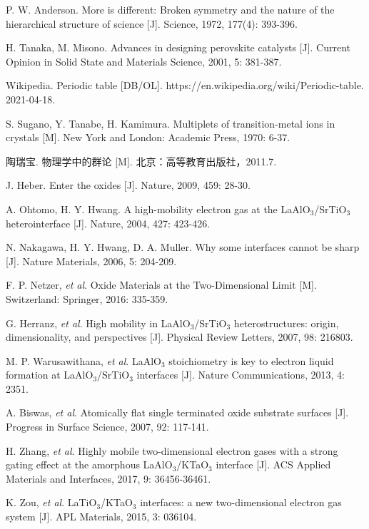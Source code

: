 \documentclass[12pt,a4paper,openany,twoside,UTF-8]{book}
\begin{document}
\newpage

\begin{thebibliography}{99}
P. W. Anderson. More is different: Broken symmetry and the nature of the hierarchical structure of science [J]. Science, 1972, 177(4): 393-396. 

H. Tanaka, M. Misono. Advances in designing perovskite catalysts [J]. Current Opinion in Solid State and Materials Science, 2001, 5: 381-387.

 Wikipedia. Periodic table [DB/OL]. https://en.wikipedia.org/wiki/Periodic-table. 2021-04-18.

S. Sugano, Y. Tanabe, H. Kamimura. Multiplets of transition-metal ions in crystals [M]. New York and London: Academic Press, 1970: 6-37.

陶瑞宝. 物理学中的群论 [M]. 北京：高等教育出版社，2011.7.

J. Heber. Enter the oxides [J]. Nature, 2009, 459: 28-30.

A. Ohtomo, H. Y. Hwang. A high-mobility electron gas at the LaAlO$_3$/SrTiO$_3$ heterointerface [J]. Nature, 2004, 427: 423-426.

N. Nakagawa, H. Y. Hwang, D. A. Muller. Why some interfaces cannot be sharp [J]. Nature Materials, 2006, 5: 204-209.

F. P. Netzer, \textit{et al}. Oxide Materials at the Two-Dimensional Limit [M]. Switzerland: Springer, 2016: 335-359.

G. Herranz, \textit{et al}. High mobility in LaAlO$_3$/SrTiO$_3$ heterostructures: origin, dimensionality, and perspectives [J]. Physical Review Letters, 2007, 98: 216803.

M. P. Warusawithana, \textit{et al}. LaAlO$_3$ stoichiometry is key to electron liquid formation at LaAlO$_3$/SrTiO$_3$ interfaces [J]. Nature Communications, 2013, 4: 2351.

A. Biswas, \textit{et al}. Atomically flat single terminated oxide substrate surfaces [J]. Progress in Surface Science, 2007, 92: 117-141.

H. Zhang, \textit{et al}. Highly mobile two-dimensional electron gases with a strong gating effect at the amorphous LaAlO$_3$/KTaO$_3$ interface [J]. ACS Applied Materials and Interfaces, 2017, 9: 36456-36461.

K. Zou, \textit{et al}. LaTiO$_3$/KTaO$_3$ interfaces: a new two-dimensional electron gas system [J]. APL Materials, 2015, 3: 036104.


\end{thebibliography}
\end{document}
